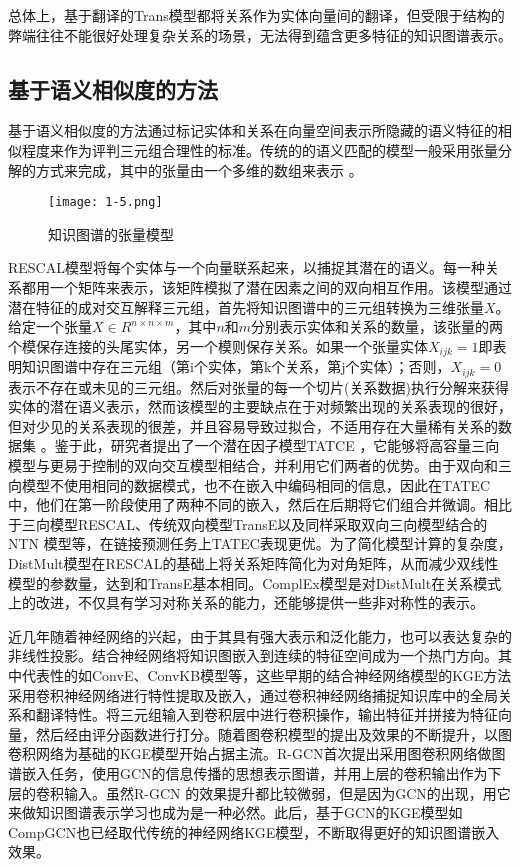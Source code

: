 总体上，基于翻译的Trans模型都将关系作为实体向量间的翻译，但受限于结构的弊端往往不能很好处理复杂关系的场景，无法得到蕴含更多特征的知识图谱表示。

\subsection{基于语义相似度的方法}
基于语义相似度的方法通过标记实体和关系在向量空间表示所隐藏的语义特征的相似程度来作为评判三元组合理性的标准。传统的的语义匹配的模型一般采用张量分解的方式来完成，其中的张量由一个多维的数组来表示 \cite{kolda2009tensor}。
\begin{figure}[h]
  \centering
  \texttt{[image: 1-5.png]}
  \caption{知识图谱的张量模型}
  \label{fig:1-5}
\end{figure}

RESCAL模型将每个实体与一个向量联系起来，以捕捉其潜在的语义。每一种关系都用一个矩阵来表示，该矩阵模拟了潜在因素之间的双向相互作用。该模型通过潜在特征的成对交互解释三元组，首先将知识图谱中的三元组转换为三维张量\(X\)。给定一个张量\(X \in R^{n×n×m}\)，其中\(n\)和\(m\)分别表示实体和关系的数量，该张量的两个模保存连接的头尾实体，另一个模则保存关系。如果一个张量实体\(X_{ijk} = 1\)即表明知识图谱中存在三元组（第i个实体，第k个关系，第j个实体）；否则，\(X_{ijk} = 0 \)表示不存在或未见的三元组。然后对张量的每一个切片(关系数据)执行分解来获得实体的潜在语义表示，然而该模型的主要缺点在于对频繁出现的关系表现的很好，但对少见的关系表现的很差，并且容易导致过拟合，不适用存在大量稀有关系的数据集 \cite{choudhary2021survey}。鉴于此，研究者提出了一个潜在因子模型TATCE \cite{garcia2014effective}，它能够将高容量三向模型与更易于控制的双向交互模型相结合，并利用它们两者的优势。由于双向和三向模型不使用相同的数据模式，也不在嵌入中编码相同的信息，因此在TATEC中，他们在第一阶段使用了两种不同的嵌入，然后在后期将它们组合并微调。相比于三向模型RESCAL、传统双向模型TransE以及同样采取双向三向模型结合的NTN \cite{socher2013reasoning}模型等，在链接预测任务上TATEC表现更优。为了简化模型计算的复杂度，DistMult模型在RESCAL的基础上将关系矩阵简化为对角矩阵，从而减少双线性模型的参数量，达到和TransE基本相同。ComplEx模型是对DistMult在关系模式上的改进，不仅具有学习对称关系的能力，还能够提供一些非对称性的表示。

近几年随着神经网络的兴起，由于其具有强大表示和泛化能力，也可以表达复杂的非线性投影。结合神经网络将知识图嵌入到连续的特征空间成为一个热门方向。其中代表性的如ConvE\cite{dettmers2018convolutional}、ConvKB\cite{nguyen2017novel}模型等，这些早期的结合神经网络模型的KGE方法采用卷积神经网络进行特性提取及嵌入，通过卷积神经网络捕捉知识库中的全局关系和翻译特性。将三元组输入到卷积层中进行卷积操作，输出特征并拼接为特征向量，然后经由评分函数进行打分。随着图卷积模型\cite{kipf2016semi}的提出及效果的不断提升，以图卷积网络为基础的KGE模型开始占据主流。R-GCN\cite{schlichtkrull2018modeling}首次提出采用图卷积网络做图谱嵌入任务，使用GCN的信息传播的思想表示图谱，并用上层的卷积输出作为下层的卷积输入。虽然R-GCN 的效果提升都比较微弱，但是因为GCN的出现，用它来做知识图谱表示学习也成为是一种必然。此后，基于GCN的KGE模型如CompGCN\cite{vashishth2019composition}也已经取代传统的神经网络KGE模型，不断取得更好的知识图谱嵌入效果。

